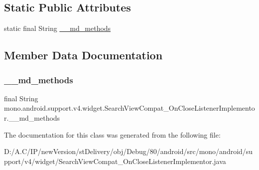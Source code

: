 \subsection*{Static Public Attributes}
\begin{DoxyCompactItemize}
\item 
static final String \hyperlink{classmono_1_1android_1_1support_1_1v4_1_1widget_1_1_search_view_compat___on_close_listener_implementor_a89aae80e52a06e276333257f14abb6c3}{\+\_\+\+\_\+md\+\_\+methods}
\end{DoxyCompactItemize}


\subsection{Member Data Documentation}
\mbox{\label{classmono_1_1android_1_1support_1_1v4_1_1widget_1_1_search_view_compat___on_close_listener_implementor_a89aae80e52a06e276333257f14abb6c3}} 
\subsubsection{\texorpdfstring{\+\_\+\+\_\+md\+\_\+methods}{\_\_md\_methods}}
{\footnotesize\ttfamily final String mono.\+android.\+support.\+v4.\+widget.\+Search\+View\+Compat\+\_\+\+On\+Close\+Listener\+Implementor.\+\_\+\+\_\+md\+\_\+methods\hspace{0.3cm}{\ttfamily [static]}}



The documentation for this class was generated from the following file\+:\begin{DoxyCompactItemize}
\item 
D\+:/\+A.\+C/\+I\+P/new\+Version/st\+Delivery/obj/\+Debug/80/android/src/mono/android/support/v4/widget/Search\+View\+Compat\+\_\+\+On\+Close\+Listener\+Implementor.\+java\end{DoxyCompactItemize}
